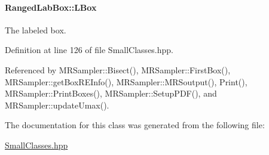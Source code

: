 \hypertarget{classRangedLabBox_a2e70b4cbd89cb43736b04612d35efd89}{
\paragraph[{\-L\-Box}]{ {\bf \-Ranged\-Lab\-Box\-::\-L\-Box}}}\label{classRangedLabBox_a2e70b4cbd89cb43736b04612d35efd89}


\-The labeled box. 



\-Definition at line 126 of file \-Small\-Classes.\-hpp.



\-Referenced by \-M\-R\-Sampler\-::\-Bisect(), \-M\-R\-Sampler\-::\-First\-Box(), \-M\-R\-Sampler\-::get\-Box\-R\-E\-Info(), \-M\-R\-Sampler\-::\-M\-R\-Soutput(), \-Print(), \-M\-R\-Sampler\-::\-Print\-Boxes(), \-M\-R\-Sampler\-::\-Setup\-P\-D\-F(), and \-M\-R\-Sampler\-::update\-Umax().



\-The documentation for this class was generated from the following file\-:\begin{DoxyCompactItemize}
\item 
\hyperlink{SmallClasses_8hpp}{\-Small\-Classes.\-hpp}\end{DoxyCompactItemize}

